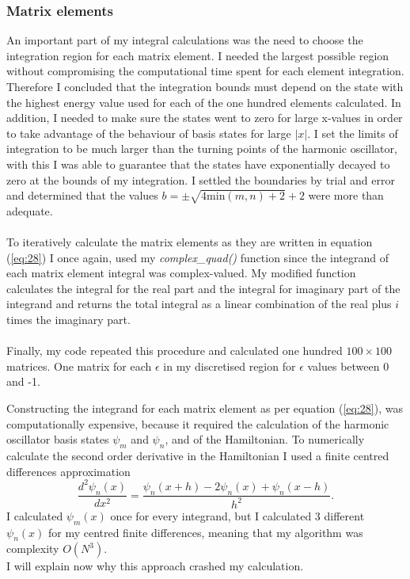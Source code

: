 \documentclass[10pt, a4paper, singlespacing]{report}
\begin{document}
\subsubsection{Matrix elements}\label{Matrix elements}
An important part of my integral calculations was the need to choose the integration region for each matrix element. I needed the largest possible region without compromising the computational time spent for each element integration. Therefore I concluded that the integration bounds must depend on the state with the highest energy value used for each of the one hundred elements calculated. In addition, I needed to make sure the states went to zero for large x-values in order to take advantage of the behaviour of basis states for large $|x|$. I set the limits of integration to be much larger than the turning points of the harmonic oscillator, with this I was able to guarantee that the states have exponentially decayed to zero at the bounds of my integration. I settled the boundaries by trial and error and determined that the values $b = \pm \sqrt{4 \mathrm{min}(m,n) + 2} + 2$ were more than adequate.\\\\
To iteratively calculate the matrix elements as they are written in equation (\ref{eq:28}) I once again, used my \emph{complex\_quad()} function since the integrand of each matrix element integral was complex-valued. My modified function calculates the integral for the real part and the integral for imaginary part of the integrand and returns the total integral as a linear combination of the real plus $i$ times the imaginary part.\\
\\Finally, my code repeated this procedure and calculated one hundred $100\times100$ matrices. One matrix for each $\epsilon$ in my discretised region for $\epsilon$ values between 0 and -1.

Constructing the integrand for each matrix element as per equation (\ref{eq:28}), was computationally expensive, because it required the calculation of the harmonic oscillator basis states $\psi_m$ and $\psi_n$, and of the Hamiltonian. To numerically calculate the second order derivative in the Hamiltonian I used a finite centred differences approximation
\begin{equation}\label{eq:29}
\frac{d^2 \psi_n(x)}{dx^2} = \frac{\psi_n(x + h) - 2 \psi_n(x) + \psi_n(x - h)}{h^2}.
\end{equation}
I calculated $\psi_m(x)$ once for every integrand, but I calculated 3 different $\psi_n(x)$ for my centred finite differences, meaning that my algorithm was complexity $O(N^3)$.\\ I will explain now why this approach crashed my calculation.\\
\end{document}
